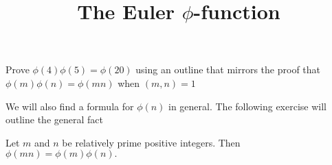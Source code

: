 \documentclass{ximera}
\title{The Euler $\phi$-function}
\begin{document}
\begin{abstract}
\end{abstract}
\maketitle

% 

\begin{obj}
\item Prove $\phi(4)\phi(5)=\phi(20)$ using an outline that mirrors the proof that $\phi(m)\phi(n)=\phi(mn)$ when $(m,n)=1$
\end{obj}


We will also find a formula for $\phi(n)$ in general. The following exercise will outline the general fact 


\begin{theorem}\label{thm:phi-multiplicative}
    Let $m$ and $n$ be relatively prime positive integers. Then $\phi(mn)=\phi(m)\phi(n).$
\end{theorem}
\end{document}
